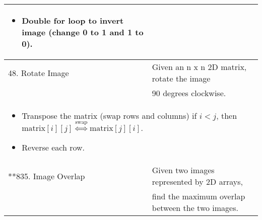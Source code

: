 \begin{summary}
\begin{center}
\begin{tabular}{ll}
{\begin{itemize}
                    \item Double for loop to invert image (change 0 to 1 and 1 to 0).
                \end{itemize}
            } \\
            \midrule
            48. Rotate Image & Given an n x n 2D matrix, rotate the image \\
            & 90 degrees clockwise. \\
            \multicolumn{2}{p{\linewidth}}{
                \begin{itemize}
                    \item Transpose the matrix (swap rows and columns) if $i<j$, then $\text{matrix}[i][j] \overset{\text{swap}}{\iff} \text{matrix}[j][i]$.
                    \item Reverse each row.
                \end{itemize}
            } \\
            \midrule
            **835. Image Overlap & Given two images represented by 2D arrays, \\
            & find the maximum overlap between the two images. \\
        \end{tabular}
    \end{center}
\end{summary}